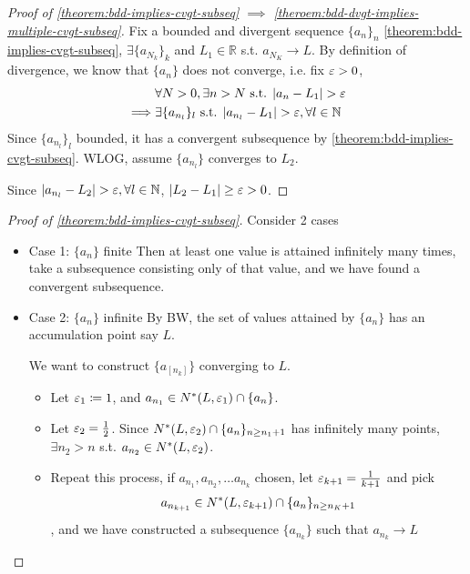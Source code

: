 \begin{proof}[Proof of 
    \ref{theorem:bdd-implies-cvgt-subseq} 
    $\implies$
    \ref{theroem:bdd-dvgt-implies-multiple-cvgt-subseq}]
    \hfill

    Fix a bounded and divergent sequence $\{ a_n \}_n $
    \ref{theorem:bdd-implies-cvgt-subseq},
    $\exists \{ a_{N_k} \}_k $ and $L_1 \in \mathbb{R}$  s.t. 
    $a_{N_K} \to L$.
    By definition of divergence, we know that $ \{ a_n \} $ 
    does not converge, i.e. fix $\varepsilon > 0$,
    \begin{align*}
        & \forall N > 0, \exists n > N \text{ s.t. } 
        |a_n - L_1| > \varepsilon \\
        \implies & \exists \{ a_{n_l} \}_l \text{ s.t. }
        |a_{n_l} - L_1| > \varepsilon, \forall l \in \mathbb{N}
    \end{align*}
    Since $\{ a_{n_l} \}_l $ bounded, it has a convergent subsequence by 
    \ref{theorem:bdd-implies-cvgt-subseq}. WLOG, assume $\{ a_{n_l} \} $
    converges to $L_2$. 
    \medskip

    Since $|a_{n_l} - L_2| > \varepsilon, \forall l \in \mathbb{N}$, 
    $|L_2 - L_1| \geq \varepsilon > 0$.
\end{proof}

\begin{proof}[Proof of \ref{theorem:bdd-implies-cvgt-subseq}]
    \hfill

    Consider 2 cases 
    \begin{itemize}
        \item Case 1: $\{ a_n \} $ finite
        Then at least one value is attained infinitely many times, 
        take a subsequence consisting only of that value, and
        we have found a convergent subsequence. 
        \item Case 2: $\{ a_n \} $ infinite
        By BW, the set of values attained by $\{ a_n \} $
        has an accumulation point say $L$.
        \medskip

        We want to construct $\{ a_[n_k] \} $ converging to $L$. 
        \begin{itemize}
            \item Let $\varepsilon_1 \coloneq 1$, and 
            $a_{n_1} \in N^*(L, \varepsilon_1) \cap \{ a_n \}$.
            \item Let $\varepsilon_2 = \frac{1}{2}$. 
            Since $N^*(L, \varepsilon_2) \cap \{ a_n \}_{n \geq n_1 + 1} $ has infinitely
            many points, $\exists n_2 > n$ s.t. $a_{n_2} \in N^*(L, \varepsilon_2)$. 
            \item Repeat this process, if $a_{n_1}, a_{n_2}, \hdots a_{n_k}$ chosen, 
            let $\varepsilon_{k + 1} = \frac{1}{k + 1}$ and pick
            \[
                a_{n_{k + 1}} \in N^*(L, \varepsilon_{k + 1}) \cap \{ a_n \}_{n \geq n_K + 1}
            \], 
            and we have constructed a subsequence $\{ a_{n_k} \} $ such that 
            $a_{n_k} \rightarrow L$
        \end{itemize} 
    \end{itemize} 
\end{proof}

